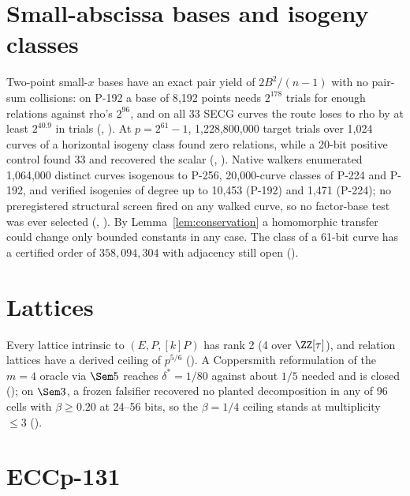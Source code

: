 \section{Small-abscissa bases and isogeny classes}

Two-point small-$x$ bases have an exact pair yield of $2B^2/(n-1)$ with no
pair-sum collisions: on P-192 a base of 8{,}192 points needs $2^{178}$ trials
for enough relations against rho's $2^{96}$, and on all 33 SECG curves the
route loses to rho by at least $2^{40.9}$ in trials
(,
). At $p=2^{61}-1$, 1{,}228{,}800{,}000
target trials over 1{,}024 curves of a horizontal isogeny class found zero
relations, while a 20-bit positive control found 33 and recovered the
scalar (,
). Native walkers enumerated
1{,}064{,}000 distinct curves isogenous to P-256, 20{,}000-curve classes of
P-224 and P-192, and verified isogenies of degree up to 10{,}453 (P-192) and
1{,}471 (P-224); no preregistered structural screen fired on any walked
curve, so no factor-base test was ever selected
(,
). By
Lemma~\ref{lem:conservation} a homomorphic transfer could change only
bounded constants in any case. The class of a 61-bit curve has a
certified order of $358{,}094{,}304$ with adjacency still open
().

\section{Lattices}

Every lattice intrinsic to $(E,P,[k]P)$ has rank 2 (4 over $\ZZ[\tau]$), and
relation lattices have a derived ceiling of $p^{5/6}$
().
A Coppersmith reformulation of the $m=4$ oracle via $\Sem5$ reaches
$\delta^*=1/80$ against about $1/5$ needed and is closed
(); on $\Sem3$, a
frozen falsifier recovered no planted decomposition in any of 96 cells with
$\beta\ge0.20$ at 24--56 bits, so the $\beta=1/4$ ceiling stands at
multiplicity $\le3$ ().

\section{ECCp-131}

